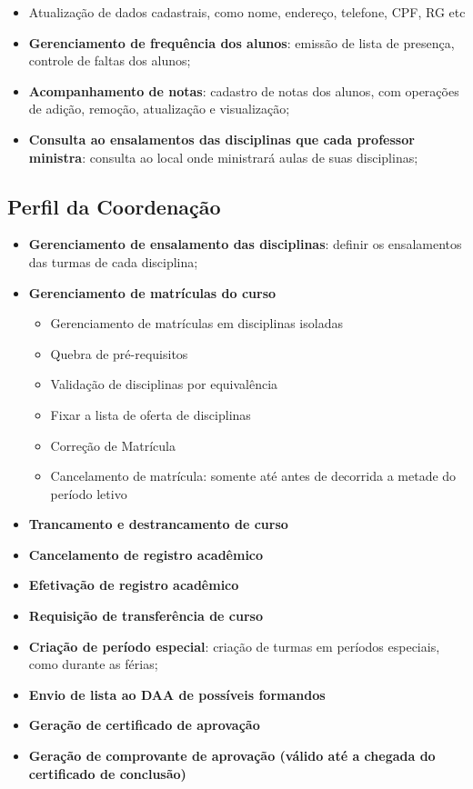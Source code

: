 \documentclass{book}
\begin{document}
\begin{itemize}
	\item Atualização de dados cadastrais, como nome, endereço, telefone, CPF, RG etc
	\item \textbf{Gerenciamento de frequência dos alunos}: emissão de lista de presença, controle de faltas dos alunos;
	\item \textbf{Acompanhamento de notas}: cadastro de notas dos alunos, com operações de adição, remoção, atualização e visualização;
	\item \textbf{Consulta ao ensalamentos das disciplinas que cada professor ministra}: consulta ao local onde ministrará aulas de suas disciplinas;
\end{itemize}




\subsection{Perfil da Coordenação}

\begin{itemize}
	\item \textbf{Gerenciamento de ensalamento das disciplinas}: definir os ensalamentos das turmas de cada disciplina;
	\item \textbf{Gerenciamento de matrículas do curso}
		\begin{itemize}
			\item Gerenciamento de matrículas em disciplinas isoladas
			\item Quebra de pré-requisitos
			\item Validação de disciplinas por equivalência
			\item Fixar a lista de oferta de disciplinas
			\item Correção de Matrícula
			\item Cancelamento de matrícula: somente até antes de decorrida a metade do período letivo
		\end{itemize}
	\item \textbf{Trancamento e destrancamento de curso}
	\item \textbf{Cancelamento de registro acadêmico}
	\item \textbf{Efetivação de registro acadêmico}
	\item \textbf{Requisição de transferência de curso}
	\item \textbf{Criação de período especial}: criação de turmas em períodos especiais, como durante as férias;%
	\item \textbf{Envio de lista ao DAA de possíveis formandos}%
	\item \textbf{Geração de certificado de aprovação}%
	\item \textbf{Geração de comprovante de aprovação (válido até a chegada do certificado de conclusão)}
\end{itemize}
\end{document}
